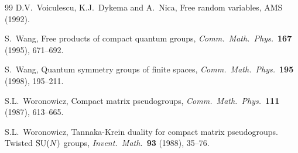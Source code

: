 \documentclass[11pt]{amsart}
\theoremstyle{definition}
\theoremstyle{remark}
\theoremstyle{plain}
\numberwithin{equation}{section}
\numberwithin{table}{section}
\begin{document}
\begin{thebibliography}{99}
 D.V.~Voiculescu, K.J.~Dykema and A.~Nica, Free random variables, AMS (1992).

 S.~Wang, Free products of compact quantum groups, \emph{Comm.\ Math.\ Phys.}\ \textbf{167} (1995), 671--692.

 S.~Wang, Quantum symmetry groups of finite spaces, \emph{Comm.\ Math.\ Phys.}\ \textbf{195} (1998), 195--211.

 S.L.~Woronowicz, Compact matrix pseudogroups, \emph{Comm.\ Math.\ Phys.}\ \textbf{111} (1987), 613--665.

 S.L.~Woronowicz, Tannaka-Krein duality for compact matrix pseudogroups. Twisted ${\rm SU}(N)$ groups, \emph{Invent.\ Math.}\ \textbf{93} (1988), 35--76.

\end{thebibliography}
\end{document}
